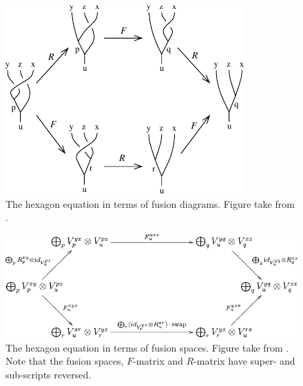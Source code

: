 \documentclass[a4paper,10pt,oneside]{book}
\theoremstyle{plain}
\theoremstyle{definition}
\theoremstyle{remark}
\begin{document}
{\begin{figure}[h]
  \centering
  \includegraphics[width=0.8\linewidth]{img/hexagon_diagram.pdf}
  \caption{The hexagon equation in terms of fusion diagrams. Figure take from \cite{kitaev}.}
  \label{fig:hexagon_diagram}
\end{figure}

\begin{figure}[h]
  \centering
  \includegraphics[width=1\linewidth]{img/hexagon_space.pdf}
  \caption{The hexagon equation in terms of fusion spaces. Figure take from \cite{kitaev}. Note that the fusion spaces, $F$-matrix and $R$-matrix have super- and sub-scripts reversed.}
  \label{fig:hexagon_space}
\end{figure}


\clearpage































}
\end{document}
